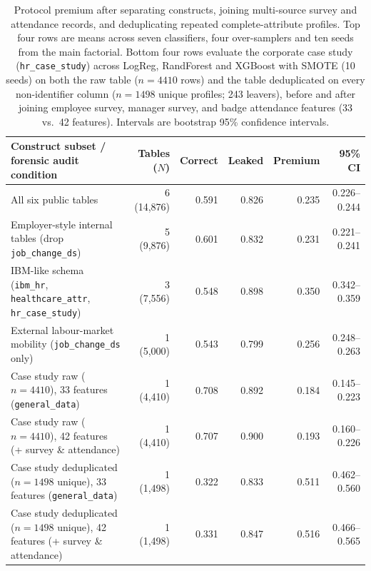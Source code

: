 \documentclass[12pt,a4paper]{article}
\begin{document}
\begin{table}[p]
\centering\singlespacing\small\setlength{\tabcolsep}{3pt}
\caption{Protocol premium after separating constructs, joining multi-source survey and attendance records, and deduplicating repeated complete-attribute profiles. Top four rows are means across seven classifiers, four over-samplers and ten seeds from the main factorial. Bottom four rows evaluate the corporate case study (\texttt{hr\_case\_study}) across LogReg, RandForest and XGBoost with SMOTE (10 seeds) on both the raw table ($n=4410$ rows) and the table deduplicated on every non-identifier column ($n=1498$ unique profiles; 243 leavers), before and after joining employee survey, manager survey, and badge attendance features (33 vs.\ 42 features). Intervals are bootstrap 95\% confidence intervals.}
\label{tab:7}
\begin{tabularx}{\textwidth}{@{}Xrrrrr@{}}
\toprule
\textbf{Construct subset / forensic audit condition} & \textbf{Tables ($N$)} & \textbf{Correct} & \textbf{Leaked} & \textbf{Premium} & \textbf{95\% CI} \\
\midrule
All six public tables & 6 (14,876) & 0.591 & 0.826 & 0.235 & 0.226--0.244 \\
Employer-style internal tables (drop \texttt{job\_change\_ds}) & 5 (9,876) & 0.601 & 0.832 & 0.231 & 0.221--0.241 \\
IBM-like schema (\texttt{ibm\_hr}, \texttt{healthcare\_attr}, \texttt{hr\_case\_study}) & 3 (7,556) & 0.548 & 0.898 & 0.350 & 0.342--0.359 \\
External labour-market mobility (\texttt{job\_change\_ds} only) & 1 (5,000) & 0.543 & 0.799 & 0.256 & 0.248--0.263 \\
\midrule
Case study raw ($n=4410$), 33 features (\texttt{general\_data}) & 1 (4,410) & 0.708 & 0.892 & 0.184 & 0.145--0.223 \\
Case study raw ($n=4410$), 42 features (+ survey \& attendance) & 1 (4,410) & 0.707 & 0.900 & 0.193 & 0.160--0.226 \\
Case study deduplicated ($n=1498$ unique), 33 features (\texttt{general\_data}) & 1 (1,498) & 0.322 & 0.833 & 0.511 & 0.462--0.560 \\
Case study deduplicated ($n=1498$ unique), 42 features (+ survey \& attendance) & 1 (1,498) & 0.331 & 0.847 & 0.516 & 0.466--0.565 \\
\bottomrule
\end{tabularx}
\end{table}
\clearpage
\end{document}
